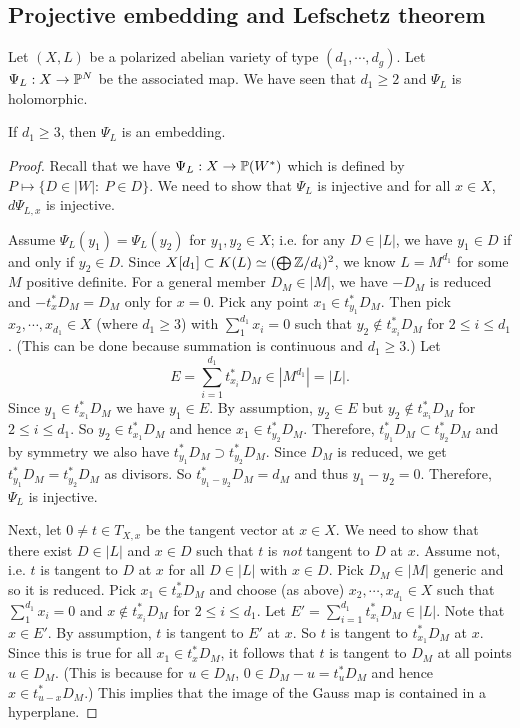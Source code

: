 \subsection{Projective embedding and Lefschetz theorem}
Let $(X,L)$ be a polarized abelian variety of type $(d_1,\cdots, d_g)$. Let $\Psi_L:X\to {\mathbb P}^N$ be the associated map. We have seen that $d_1\geq 2$ and $\Psi_L$ is holomorphic. 

\begin{theorem}[Lefschetz]
If $d_1\geq 3$, then $\Psi_L$ is an embedding. 
\end{theorem} 

\begin{proof}
Recall that we have $\Psi_L:X\to {\mathbb P}(W^*)$ which is defined by $P\mapsto \{D\in |W|:\ P\in D\}$. We need to show that $\Psi_L$ is injective and for all $x\in X$, $d\Psi_{L,x}$ is injective. 

Assume $\Psi_L(y_1)=\Psi_L(y_2)$ for $y_1,y_2\in X$; i.e. for any $D\in |L|$, we have $y_1\in D$ if and only if $y_2\in D$. Since $X[d_1]\subset K(L)\simeq (\bigoplus {\mathbb Z}/d_i)^2$, we know $L=M^{d_1}$ for some $M$ positive definite. For a general member $D_M\in |M|$, we have $-D_M$ is reduced and $-t_x^* D_M=D_M$ only for $x=0$. Pick any point $x_1\in t_{y_1}^*D_M$. Then pick $x_2,\cdots, x_{d_1}\in X$ (where $d_1\geq 3$) with $\sum_{1}^{d_1} x_i=0$ such that $y_2\not\in t_{x_i}^* D_M$ for $2\leq i \leq d_1$. (This can be done because summation is continuous and $d_1\geq 3$.) Let 
\[
E=\sum_{i=1}^{d_1} t_{x_i}^* D_M\in |M^{d_1}|=|L|. 
\]
Since $y_1\in t_{x_1}^* D_M$ we have $y_1\in E$. By assumption, $y_2\in E$ but $y_2\not\in t_{x_i}^* D_M$ for $2\leq i \leq d_1$. So $y_2\in t_{x_1}^* D_M$ and hence $x_1\in t_{y_2}^* D_M$. Therefore, $t_{y_1}^* D_M\subset t_{y_2}^* D_M$ and by symmetry we also have $t_{y_1}^* D_M\supset t_{y_2}^* D_M$. Since $D_M$ is reduced, we get $t_{y_1}^* D_M=t_{y_2}^* D_M$ as divisors. So $t_{y_1-y_2}^* D_M=d_M$ and thus $y_1-y_2=0$. Therefore, $\Psi_L$ is injective.

Next, let $0\not=t\in T_{X,x}$ be the tangent vector at $x\in X$. We need to show that there exist $D\in |L|$ and $x\in D$ such that $t$ is \emph{not} tangent to $D$ at $x$. Assume not, i.e. $t$ is tangent to $D$ at $x$ for all $D\in |L|$ with $x\in D$. Pick $D_M\in |M|$ generic and so it is reduced. Pick $x_1\in t_{x}^* D_M$ and choose (as above) $x_2,\cdots, x_{d_1}\in X$ such that $\sum_1^{d_1} x_i=0$ and $x\not\in t_{x_i}^* D_M$ for $2\leq i \leq d_1$. Let $E'=\sum_{i=1}^{d_1} t_{x_i}^* D_M\in |L|$. Note that $x\in E'$. By assumption, $t$ is tangent to $E'$ at $x$. So $t$ is tangent to $t_{x_1}^* D_M$ at $x$. Since this is true for all $x_1\in t_x^* D_M$, it follows that $t$ is tangent to $D_M$ at all points $u\in D_M$. (This is because for $u\in D_M$, $0\in D_M-u=t_u^* D_M$ and hence $x\in t_{u-x}^* D_M$.) This implies that the image of the Gauss map is contained in a hyperplane.    
\end{proof}

